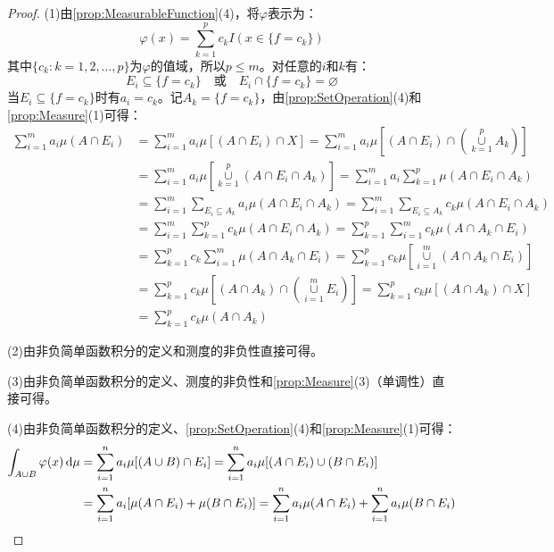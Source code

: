 \begin{proof}
	(1)由\cref{prop:MeasurableFunction}(4)，将$\varphi$表示为：
	\begin{equation*}
		\varphi(x)=\sum_{k=1}^{p}c_kI(x\in\{f=c_k\})
	\end{equation*}
	其中$\{c_k:k=1,2,\dots,p\}$为$\varphi$的值域，所以$p\leqslant m$。对任意的$i$和$k$有：
	\begin{equation*}
		E_i\subseteq\{f=c_k\}\quad\text{或}\quad E_i\cap\{f=c_k\}=\varnothing
	\end{equation*}
	当$E_i\subseteq\{f=c_k\}$时有$a_i=c_k$。记$A_k=\{f=c_k\}$，由\cref{prop:SetOperation}(4)和\cref{prop:Measure}(1)可得：
	\begin{align*}
		\sum_{i=1}^{m}a_i\mu(A\cap E_i)
		&=\sum_{i=1}^{m}a_i\mu[(A\cap E_i)\cap X]
		=\sum_{i=1}^{m}a_i\mu\left[(A\cap E_i)\cap\left(\underset{k=1}{\overset{p}{\cup}}A_k\right)\right] \\
		&=\sum_{i=1}^{m}a_i\mu\left[\underset{k=1}{\overset{p}{\cup}}(A\cap E_i\cap A_k)\right]
		=\sum_{i=1}^{m}a_i\sum_{k=1}^{p}\mu(A\cap E_i\cap A_k) \\
		&=\sum_{i=1}^{m}\sum_{E_i\subseteq A_k}a_i\mu(A\cap E_i\cap A_k)
		=\sum_{i=1}^{m}\sum_{E_i\subseteq A_k}c_k\mu(A\cap E_i\cap A_k) \\
		&=\sum_{i=1}^{m}\sum_{k=1}^{p}c_k\mu(A\cap E_i\cap A_k)
		=\sum_{k=1}^{p}\sum_{i=1}^{m}c_k\mu(A\cap A_k\cap E_i) \\
		&=\sum_{k=1}^{p}c_k\sum_{i=1}^{m}\mu(A\cap A_k\cap E_i)
		=\sum_{k=1}^{p}c_k\mu\left[\underset{i=1}{\overset{m}{\cup}}(A\cap A_k\cap E_i)\right] \\
		&=\sum_{k=1}^{p}c_k\mu\left[(A\cap A_k)\cap\left(\underset{i=1}{\overset{m}{\cup}}E_i\right)\right]
		=\sum_{k=1}^{p}c_k\mu[(A\cap A_k)\cap X] \\
		&=\sum_{k=1}^{p}c_k\mu(A\cap A_k)
	\end{align*}\par
	(2)由非负简单函数积分的定义和测度的非负性直接可得。\par
	(3)由非负简单函数积分的定义、测度的非负性和\cref{prop:Measure}(3)（单调性）直接可得。\par
	(4)由非负简单函数积分的定义、\cref{prop:SetOperation}(4)和\cref{prop:Measure}(1)可得：
	\begin{align*}
		\int_{A\cup B}\varphi(x)\dif\mu
		&=\sum_{i=1}^{n}a_i\mu[(A\cup B)\cap E_i]
		=\sum_{i=1}^{n}a_i\mu[(A\cap E_i)\cup(B\cap E_i)] \\
		&=\sum_{i=1}^{n}a_i[\mu(A\cap E_i)+\mu(B\cap E_i)]
		=\sum_{i=1}^{n}a_i\mu(A\cap E_i)+\sum_{i=1}^{n}a_i\mu(B\cap E_i) \\

\end{align*}
\end{proof}
